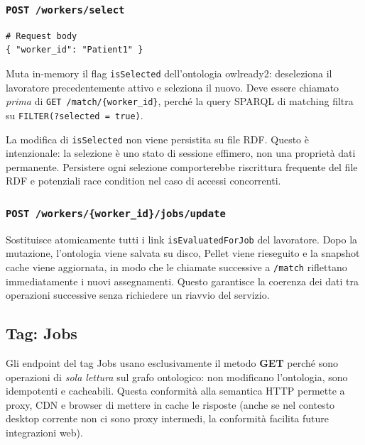 \documentclass[a4paper,12pt]{article}
\begin{document}
\subsubsection{\texttt{POST /workers/select}}

\begin{lstlisting}[caption={Selezione del lavoratore attivo.}]
# Request body
{ "worker_id": "Patient1" }
\end{lstlisting}

\noindent Muta in-memory il flag \texttt{isSelected} dell'ontologia owlready2:
deseleziona il lavoratore precedentemente attivo e seleziona il nuovo.
Deve essere chiamato \textit{prima} di \texttt{GET /match/\{worker\_id\}},
perch\'{e} la query SPARQL di matching filtra su \texttt{FILTER(?selected = true)}.

\begin{infobox}
La modifica di \texttt{isSelected} non viene persistita su file RDF.
Questo \`{e} intenzionale: la selezione \`{e} uno stato di sessione effimero,
non una propriet\`{a} dati permanente. Persistere ogni selezione comporterebbe
riscrittura frequente del file RDF e potenziali race condition nel caso
di accessi concorrenti.
\end{infobox}

\subsubsection{\texttt{POST /workers/\{worker\_id\}/jobs/update}}

Sostituisce atomicamente tutti i link \texttt{isEvaluatedForJob} del
lavoratore. Dopo la mutazione, l'ontologia viene salvata su disco,
Pellet viene rieseguito e la snapshot cache viene aggiornata, in modo
che le chiamate successive a \texttt{/match} riflettano immediatamente
i nuovi assegnamenti. Questo garantisce la coerenza dei dati tra
operazioni successive senza richiedere un riavvio del servizio.

\subsection{Tag: Jobs}

Gli endpoint del tag Jobs usano esclusivamente il metodo \textbf{GET}
perch\'{e} sono operazioni di \textit{sola lettura} sul grafo ontologico:
non modificano l'ontologia, sono idempotenti e cacheabili. Questa
conformit\`{a} alla semantica HTTP permette a proxy, CDN e browser di
mettere in cache le risposte (anche se nel contesto desktop corrente
non ci sono proxy intermedi, la conformit\`{a} facilita future
integrazioni web).
\end{document}
